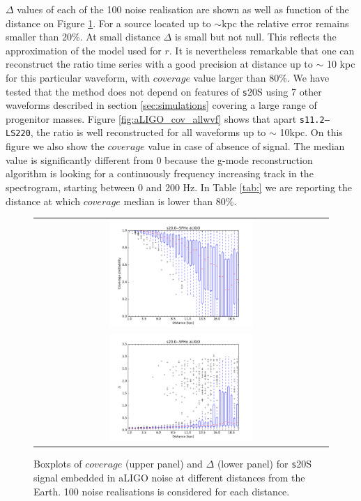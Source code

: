$\Delta$ values of each of the 100 noise realisation are shown as well as function of the distance
on Figure \ref{fig:s20results}. For a source located up to $\sim$\unit[10]{kpc} the relative error
remains smaller than 20\%. At small distance $\Delta$ is small but not null. This reflects the
approximation of the model used for $r$.
It is nevertheless remarkable that one can reconstruct the ratio time series with a good
precision at distance up to $\sim$ 10 kpc for this particular waveform, with $coverage$ value
larger than 80\%.
We have tested that the method does not depend on features of {\texttt s20S} using 7 other waveforms
described in section \ref{sec:simulations} covering a large range of progenitor masses.
Figure \ref{fig:aLIGO_cov_allwvf} shows that apart {\tt s11.2--LS220}, the ratio is well
reconstructed for all waveforms up to $\sim$ 10kpc. On this figure we also show the $coverage$
value in case of absence of signal. The median value is significantly different from 0 because
the g-mode reconstruction algorithm is looking for a continuously frequency increasing track
in the spectrogram, starting between 0 and 200 Hz. In Table \ref{tab:} we are reporting the
distance at which $coverage$ median is lower than 80\%. 



\begin{figure}
  \centering
  \begin{tabular}{c}
    \includegraphics[width=0.5\textwidth]{plots/s20--SFHo_covpbb_boxplot_aLIGO} \\
    \includegraphics[width=0.5\textwidth]{plots/s20--SFHo_error_boxplot_aLIGO} \\
  \end{tabular}
    
 \caption{Boxplots of $coverage$ (upper panel) and $\Delta$ (lower panel) for {\texttt s20S} signal embedded in aLIGO noise at different distances from the Earth. 100 noise realisations is considered for each distance.} \label{fig:s20results}
\end{figure}


